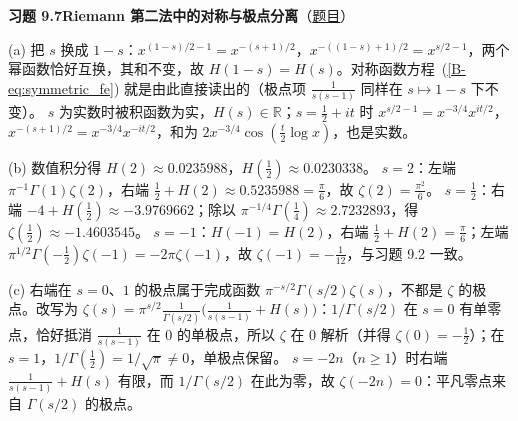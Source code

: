 \documentclass[11pt,a4paper]{article}
\newcommand{\RR}{\mathbb{R}}
\newcommand{\bref}[1]{\ref*{B-#1}}
\newcommand{\Sol}[2]{%
  \par\addvspace{1.2em}\noindent
  \hypertarget{s:#1}{}\textbf{习题 #1\quad #2}\hfill{\small（\hyperlink{q:#1}{题目}）}\par
  \nopagebreak\smallskip}
\begin{document}
\Sol{9.7}{Riemann 第二法中的对称与极点分离}
(a) 把 $s$ 换成 $1-s$：$x^{(1-s)/2-1}=x^{-(s+1)/2}$，$x^{-((1-s)+1)/2}=x^{s/2-1}$，两个幂函数恰好互换，其和不变，故 $H(1-s)=H(s)$。对称函数方程~(\bref{eq:symmetric_fe}) 就是由此直接读出的（极点项 $\frac1{s(s-1)}$ 同样在 $s\mapsto1-s$ 下不变）。
$s$ 为实数时被积函数为实，$H(s)\in\RR$；$s=\frac12+it$ 时 $x^{s/2-1}=x^{-3/4}x^{it/2}$，$x^{-(s+1)/2}=x^{-3/4}x^{-it/2}$，和为 $2x^{-3/4}\cos(\frac t2\log x)$，也是实数。

(b) 数值积分得 $H(2)\approx0.0235988$，$H(\tfrac12)\approx0.0230338$。
$s=2$：左端 $\pi^{-1}\Gamma(1)\zeta(2)$，右端 $\frac12+H(2)\approx0.5235988=\frac\pi6$，故 $\zeta(2)=\frac{\pi^2}6$。
$s=\frac12$：右端 $-4+H(\tfrac12)\approx-3.9769662$；除以 $\pi^{-1/4}\Gamma(\tfrac14)\approx2.7232893$，得 $\zeta(\tfrac12)\approx-1.4603545$。
$s=-1$：$H(-1)=H(2)$，右端 $\frac12+H(2)=\frac\pi6$；左端 $\pi^{1/2}\Gamma(-\tfrac12)\zeta(-1)=-2\pi\zeta(-1)$，故 $\zeta(-1)=-\frac1{12}$，与习题 9.2 一致。

(c) 右端在 $s=0$、$1$ 的极点属于完成函数 $\pi^{-s/2}\Gamma(s/2)\zeta(s)$，不都是 $\zeta$ 的极点。改写为 $\zeta(s)=\pi^{s/2}\frac1{\Gamma(s/2)}\bigl(\frac1{s(s-1)}+H(s)\bigr)$：$1/\Gamma(s/2)$ 在 $s=0$ 有单零点，恰好抵消 $\frac1{s(s-1)}$ 在 $0$ 的单极点，所以 $\zeta$ 在 $0$ 解析（并得 $\zeta(0)=-\frac12$）；在 $s=1$，$1/\Gamma(\frac12)=1/\sqrt\pi\ne0$，单极点保留。
$s=-2n$（$n\ge1$）时右端 $\frac1{s(s-1)}+H(s)$ 有限，而 $1/\Gamma(s/2)$ 在此为零，故 $\zeta(-2n)=0$：平凡零点来自 $\Gamma(s/2)$ 的极点。
\end{document}
